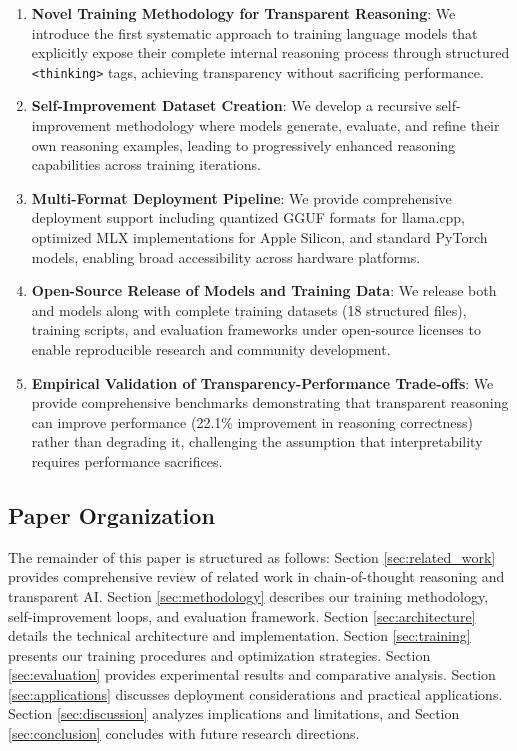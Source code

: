 \begin{enumerate}
    \item \textbf{Novel Training Methodology for Transparent Reasoning}: We introduce the first systematic approach to training language models that explicitly expose their complete internal reasoning process through structured \texttt{<thinking>} tags, achieving transparency without sacrificing performance.
    
    \item \textbf{Self-Improvement Dataset Creation}: We develop a recursive self-improvement methodology where models generate, evaluate, and refine their own reasoning examples, leading to progressively enhanced reasoning capabilities across training iterations.
    
    \item \textbf{Multi-Format Deployment Pipeline}: We provide comprehensive deployment support including quantized GGUF formats for llama.cpp, optimized MLX implementations for Apple Silicon, and standard PyTorch models, enabling broad accessibility across hardware platforms.
    
    \item \textbf{Open-Source Release of Models and Training Data}: We release both \supra{} and \zennano{} models along with complete training datasets (18 structured files), training scripts, and evaluation frameworks under open-source licenses to enable reproducible research and community development.
    
    \item \textbf{Empirical Validation of Transparency-Performance Trade-offs}: We provide comprehensive benchmarks demonstrating that transparent reasoning can improve performance (22.1\% improvement in reasoning correctness) rather than degrading it, challenging the assumption that interpretability requires performance sacrifices.
\end{enumerate}

\subsection{Paper Organization}

The remainder of this paper is structured as follows: Section \ref{sec:related_work} provides comprehensive review of related work in chain-of-thought reasoning and transparent AI. Section \ref{sec:methodology} describes our training methodology, self-improvement loops, and evaluation framework. Section \ref{sec:architecture} details the technical architecture and implementation. Section \ref{sec:training} presents our training procedures and optimization strategies. Section \ref{sec:evaluation} provides experimental results and comparative analysis. Section \ref{sec:applications} discusses deployment considerations and practical applications. Section \ref{sec:discussion} analyzes implications and limitations, and Section \ref{sec:conclusion} concludes with future research directions.